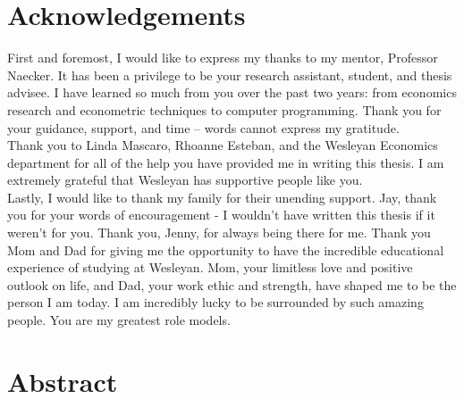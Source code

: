 \documentclass[12pt]{article}
\begin{document}


\newpage
\onehalfspacing
\tableofcontents
\thispagestyle{empty}


\newpage

\clearpage
{} 
\doublespacing
\section*{Acknowledgements}
First and foremost, I would like to express my thanks to my mentor, Professor Naecker. It has been a privilege to be your research assistant, student, and thesis advisee. I have learned so much from you over the past two years: from economics research and econometric techniques to computer programming. Thank you for your guidance, support, and time -- words cannot express my gratitude.\\

Thank you to Linda Mascaro, Rhoanne Esteban, and the Wesleyan Economics department for all of the help you have provided me in writing this thesis. I am extremely grateful that Wesleyan has supportive people like you. \\

Lastly, I would like to thank my family for their unending support. Jay, thank you for your words of encouragement - I wouldn\rq t have written this thesis if it weren\rq t for you. Thank you, Jenny, for always being there for me. Thank you Mom and Dad for giving me the opportunity to have the incredible educational experience of studying at Wesleyan. Mom, your limitless love and positive outlook on life, and Dad, your work ethic and strength, have shaped me to be the person I am today. I am incredibly lucky to be surrounded by such amazing people. You are my greatest role models.


\newpage

\section*{Abstract}
\end{document}
